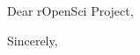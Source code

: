 \documentclass{letter}
\begin{document}
\begin{letter}{}
\opening{Dear rOpenSci Project,}


\closing{Sincerely,}
\end{letter}
\end{document}
